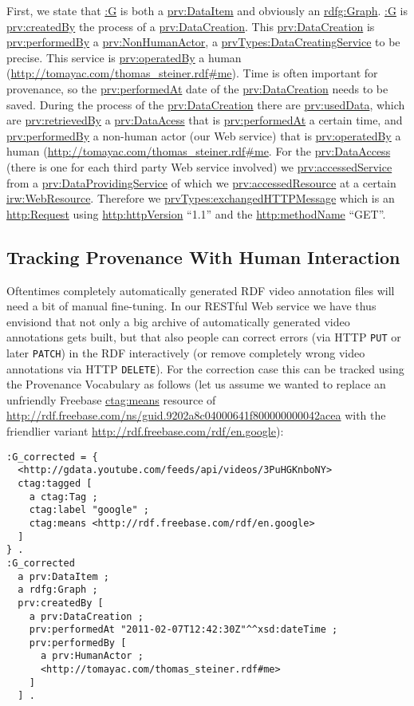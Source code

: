 \documentclass{acm_proc_article-sp}
\begin{document}
First, we state that \url{:G} is both a \url{prv:DataItem} and obviously an \url{rdfg:Graph}. \url{:G} is \url{prv:createdBy} the process of a \url{prv:DataCreation}. This \url{prv:DataCreation} is \url{prv:performedBy} a \url{prv:NonHumanActor}, a 
\url{prvTypes:DataCreatingService} to be precise. This service is \url{prv:operatedBy} a human (\url{http://tomayac.com/thomas_steiner.rdf#me}). Time is often important for provenance, so the \url{prv:performedAt} date of the \url{prv:DataCreation} needs to be saved. During the process of the \url{prv:DataCreation} there are \url{prv:usedData}, which are \url{prv:retrievedBy} a \url{prv:DataAcess} that is \url{prv:performedAt} a certain time, and \url{prv:performedBy} a non-human actor (our Web service) that is \url{prv:operatedBy} a human (\url{http://tomayac.com/thomas_steiner.rdf#me}. For the \url{prv:DataAccess} (there is one for each third party Web service involved) we \url{prv:accessedService} from a \url{prv:DataProvidingService} of which we \url{prv:accessedResource} at a certain \url{irw:WebResource}. Therefore we \url{prvTypes:exchangedHTTPMessage} which is an \url{http:Request} using \url{http:httpVersion} ``1.1'' and the \url{http:methodName} ``GET''.

\subsection{Tracking Provenance With Human Interaction}\label{sec:human}
Oftentimes completely automatically generated RDF video annotation files will need a bit of manual fine-tuning. In our RESTful Web service we have thus envisiond that not only a big archive of automatically generated video annotations gets built, but that also people can correct errors (via HTTP \texttt{PUT} or later \texttt{PATCH}) in the RDF interactively (or remove completely wrong video annotations via HTTP \texttt{DELETE}). For the correction case this can be tracked using the Provenance Vocabulary as follows (let us assume we wanted to replace an unfriendly Freebase \url{ctag:means} resource of \url{http://rdf.freebase.com/ns/guid.9202a8c04000641f800000000042acea} with the friendlier variant \url{http://rdf.freebase.com/rdf/en.google}):
\begin{lstlisting}
:G_corrected = {
  <http://gdata.youtube.com/feeds/api/videos/3PuHGKnboNY> 
  ctag:tagged [
    a ctag:Tag ;
    ctag:label "google" ;
    ctag:means <http://rdf.freebase.com/rdf/en.google> 
  ]  
} .
:G_corrected
  a prv:DataItem ;
  a rdfg:Graph ;
  prv:createdBy [
    a prv:DataCreation ;
    prv:performedAt "2011-02-07T12:42:30Z"^^xsd:dateTime ;
    prv:performedBy [
      a prv:HumanActor ;
      <http://tomayac.com/thomas_steiner.rdf#me> 
    ] 
  ] .
\end{lstlisting}
\end{document}
